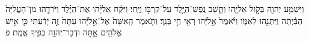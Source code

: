 \documentclass{openreader}
\begin{document}
וַיִּשְׁמַ֥ע יְהוָ֖ה בְּקֹ֣ול אֵלִיָּ֑הוּ וַתָּ֧שָׁב נֶֽפֶשׁ־הַיֶּ֛לֶד עַל־קִרְבֹּ֖ו וַיֶּֽחִי׃ 
וַיִּקַּ֨ח אֵלִיָּ֜הוּ אֶת־הַיֶּ֗לֶד וַיֹּרִדֵ֤הוּ מִן־הָעֲלִיָּה֙ הַבַּ֔יְתָה וַֽיִּתְּנֵ֖הוּ לְאִמֹּ֑ו וַיֹּ֨אמֶר֙ אֵ֣לִיָּ֔הוּ רְאִ֖י חַ֥י בְּנֵֽךְ׃ 
וַתֹּ֤אמֶר הָֽאִשָּׁה֙ אֶל־אֵ֣לִיָּ֔הוּ עַתָּה֙ זֶ֣ה יָדַ֔עְתִּי כִּ֛י אִ֥ישׁ אֱלֹהִ֖ים אָ֑תָּה וּדְבַר־יְהוָ֥ה בְּפִ֖יךָ אֱמֶֽת׃ פ 
\end{document}
